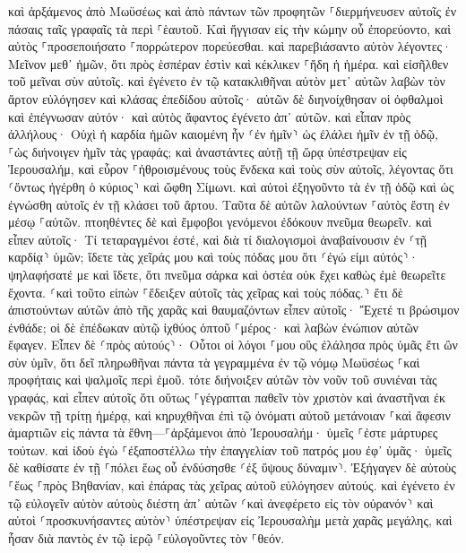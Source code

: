 \documentclass[twoside, 9pt]{extreport}
\begin{document}
καὶ ἀρξάμενος ἀπὸ Μωϋσέως καὶ ἀπὸ πάντων τῶν προφητῶν ⸀διερμήνευσεν αὐτοῖς ἐν πάσαις ταῖς γραφαῖς τὰ περὶ ⸀ἑαυτοῦ. 
Καὶ ἤγγισαν εἰς τὴν κώμην οὗ ἐπορεύοντο, καὶ αὐτὸς ⸀προσεποιήσατο ⸀πορρώτερον πορεύεσθαι. 
καὶ παρεβιάσαντο αὐτὸν λέγοντες· Μεῖνον μεθ᾽ ἡμῶν, ὅτι πρὸς ἑσπέραν ἐστὶν καὶ κέκλικεν ⸀ἤδη ἡ ἡμέρα. καὶ εἰσῆλθεν τοῦ μεῖναι σὺν αὐτοῖς. 
καὶ ἐγένετο ἐν τῷ κατακλιθῆναι αὐτὸν μετ᾽ αὐτῶν λαβὼν τὸν ἄρτον εὐλόγησεν καὶ κλάσας ἐπεδίδου αὐτοῖς· 
αὐτῶν δὲ διηνοίχθησαν οἱ ὀφθαλμοὶ καὶ ἐπέγνωσαν αὐτόν· καὶ αὐτὸς ἄφαντος ἐγένετο ἀπ᾽ αὐτῶν. 
καὶ εἶπαν πρὸς ἀλλήλους· Οὐχὶ ἡ καρδία ἡμῶν καιομένη ἦν ⸂ἐν ἡμῖν⸃ ὡς ἐλάλει ἡμῖν ἐν τῇ ὁδῷ, ⸀ὡς διήνοιγεν ἡμῖν τὰς γραφάς; 
καὶ ἀναστάντες αὐτῇ τῇ ὥρᾳ ὑπέστρεψαν εἰς Ἰερουσαλήμ, καὶ εὗρον ⸀ἠθροισμένους τοὺς ἕνδεκα καὶ τοὺς σὺν αὐτοῖς, 
λέγοντας ὅτι ⸂ὄντως ἠγέρθη ὁ κύριος⸃ καὶ ὤφθη Σίμωνι. 
καὶ αὐτοὶ ἐξηγοῦντο τὰ ἐν τῇ ὁδῷ καὶ ὡς ἐγνώσθη αὐτοῖς ἐν τῇ κλάσει τοῦ ἄρτου. 
Ταῦτα δὲ αὐτῶν λαλούντων ⸀αὐτὸς ἔστη ἐν μέσῳ ⸀αὐτῶν. 
πτοηθέντες δὲ καὶ ἔμφοβοι γενόμενοι ἐδόκουν πνεῦμα θεωρεῖν. 
καὶ εἶπεν αὐτοῖς· Τί τεταραγμένοι ἐστέ, καὶ διὰ τί διαλογισμοὶ ἀναβαίνουσιν ἐν ⸂τῇ καρδίᾳ⸃ ὑμῶν; 
ἴδετε τὰς χεῖράς μου καὶ τοὺς πόδας μου ὅτι ⸂ἐγώ εἰμι αὐτός⸃· ψηλαφήσατέ με καὶ ἴδετε, ὅτι πνεῦμα σάρκα καὶ ὀστέα οὐκ ἔχει καθὼς ἐμὲ θεωρεῖτε ἔχοντα. 
⸂καὶ τοῦτο εἰπὼν ⸀ἔδειξεν αὐτοῖς τὰς χεῖρας καὶ τοὺς πόδας.⸃ 
ἔτι δὲ ἀπιστούντων αὐτῶν ἀπὸ τῆς χαρᾶς καὶ θαυμαζόντων εἶπεν αὐτοῖς· Ἔχετέ τι βρώσιμον ἐνθάδε; 
οἱ δὲ ἐπέδωκαν αὐτῷ ἰχθύος ὀπτοῦ ⸀μέρος· 
καὶ λαβὼν ἐνώπιον αὐτῶν ἔφαγεν. 
Εἶπεν δὲ ⸂πρὸς αὐτούς⸃· Οὗτοι οἱ λόγοι ⸀μου οὓς ἐλάλησα πρὸς ὑμᾶς ἔτι ὢν σὺν ὑμῖν, ὅτι δεῖ πληρωθῆναι πάντα τὰ γεγραμμένα ἐν τῷ νόμῳ Μωϋσέως ⸀καὶ προφήταις καὶ ψαλμοῖς περὶ ἐμοῦ. 
τότε διήνοιξεν αὐτῶν τὸν νοῦν τοῦ συνιέναι τὰς γραφάς, 
καὶ εἶπεν αὐτοῖς ὅτι οὕτως ⸀γέγραπται παθεῖν τὸν χριστὸν καὶ ἀναστῆναι ἐκ νεκρῶν τῇ τρίτῃ ἡμέρᾳ, 
καὶ κηρυχθῆναι ἐπὶ τῷ ὀνόματι αὐτοῦ μετάνοιαν ⸀καὶ ἄφεσιν ἁμαρτιῶν εἰς πάντα τὰ ἔθνη—⸀ἀρξάμενοι ἀπὸ Ἰερουσαλήμ· 
ὑμεῖς ⸀ἐστε μάρτυρες τούτων. 
καὶ ἰδοὺ ἐγὼ ⸀ἐξαποστέλλω τὴν ἐπαγγελίαν τοῦ πατρός μου ἐφ᾽ ὑμᾶς· ὑμεῖς δὲ καθίσατε ἐν τῇ ⸀πόλει ἕως οὗ ἐνδύσησθε ⸂ἐξ ὕψους δύναμιν⸃. 
Ἐξήγαγεν δὲ αὐτοὺς ⸀ἕως ⸀πρὸς Βηθανίαν, καὶ ἐπάρας τὰς χεῖρας αὐτοῦ εὐλόγησεν αὐτούς. 
καὶ ἐγένετο ἐν τῷ εὐλογεῖν αὐτὸν αὐτοὺς διέστη ἀπ᾽ αὐτῶν ⸂καὶ ἀνεφέρετο εἰς τὸν οὐρανόν⸃ 
καὶ αὐτοὶ ⸂προσκυνήσαντες αὐτὸν⸃ ὑπέστρεψαν εἰς Ἰερουσαλὴμ μετὰ χαρᾶς μεγάλης, 
καὶ ἦσαν διὰ παντὸς ἐν τῷ ἱερῷ ⸀εὐλογοῦντες τὸν ⸀θεόν. 
\end{document}
